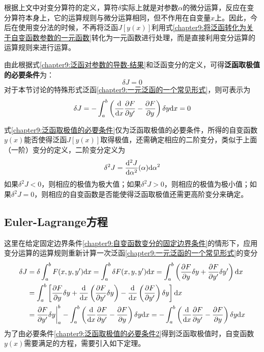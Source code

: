 根据上文中对变分算符的定义，算符$\delta$实际上就是对参数$\alpha$的微分运算，反应在变分算符本身上，它的运算规则与微分运算相同，但不作用在自变量$x$上。因此，今后在使用变分法的时候，不再将泛函$J[y(x)]$利用式\eqref{chapter9:将泛函转化为关于自变函数参数的一元函数}转化为一元函数进行处理，而是直接利用变分运算的运算规则来进行运算。

由此根据式\eqref{chapter9:泛函对参数的导数-结果}和泛函变分的定义，可得{\bf 泛函取极值的必要条件}为：
\begin{equation}
	\delta J = 0
	\label{chapter9:泛函取极值的必要条件}
\end{equation}
对于本节讨论的特殊形式泛函\eqref{chapter9:一元泛函的一个常见形式}，则可表示为
\begin{equation}
	\delta J = -\int_a^b \left(\dfrac{\mathrm{d}}{\mathrm{d} x}\frac{\partial F}{\partial y'}-\frac{\partial F}{\partial y}\right)\delta y\mathrm{d} x=0
	\label{chapter9:泛函取极值的必要条件2}
\end{equation}

式\eqref{chapter9:泛函取极值的必要条件}仅为泛函取极值的必要条件，所得的自变函数$y(x)$能否使得泛函$J[y(x)]$取得极值，还需确定相应的二阶变分，类似于上面（一阶）变分的定义，二阶变分定义为
\begin{equation}
	\delta^2J = \frac{\mathrm{d}^2 J}{\mathrm{d} \alpha^2}(\alpha)\mathrm{d} \alpha^2
\end{equation}
如果$\delta^2J<0$，则相应的极值为极大值；如果$\delta^2J>0$，则相应的极值为极小值；如果$\delta^2J=0$，则相应的自变函数是否能使得泛函取极值还需更高阶变分来确定。

\subsection{Euler-Lagrange方程}

这里在给定固定边界条件\eqref{chapter9:自变函数变分的固定边界条件}的情形下，应用变分运算的运算规则重新计算一次泛函\eqref{chapter9:一元泛函的一个常见形式}的变分
\begin{align*}
	\delta J & = \delta \int_a^b F(x,y,y')\mathrm{d} x = \int_a^b \delta F(x,y,y')\mathrm{d} x = \int_a^b \left(\frac{\partial F}{\partial y}\delta y + \frac{\partial F}{\partial y'}\delta y'\right) \mathrm{d} x \\
	& = \int_a^b \left[\frac{\partial F}{\partial y}\delta y + \dfrac{\mathrm{d}}{\mathrm{d} x}\left(\frac{\partial F}{\partial y'}\delta y\right) - \dfrac{\mathrm{d}}{\mathrm{d} x}\left(\frac{\partial F}{\partial y'}\right)\delta y\right]\mathrm{d} x \\
	& = \frac{\partial F}{\partial y'}\delta y\bigg|_a^b - \int_a^b\left(\dfrac{\mathrm{d}}{\mathrm{d} x}\frac{\partial F}{\partial y'} - \frac{\partial F}{\partial y}\right)\delta y\mathrm{d} x = - \int_a^b\left(\dfrac{\mathrm{d}}{\mathrm{d} x}\frac{\partial F}{\partial y'} - \frac{\partial F}{\partial y}\right)\delta y\mathrm{d} x
\end{align*}
为了由必要条件\eqref{chapter9:泛函取极值的必要条件2}得到泛函取极值时，自变函数$y(x)$需要满足的方程，需要引入如下定理。


